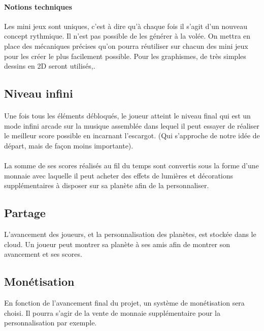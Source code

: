 \documentclass[a4paper,11pt]{article}
\begin{document}
\paragraph{Notions techniques}
Les mini jeux sont uniques, c’est à dire qu’à chaque fois il s’agit d’un nouveau concept rythmique. Il n’est pas possible de les générer à la volée. On mettra en place des mécaniques précises qu’on pourra réutiliser sur chacun des mini jeux pour les créer le plus facilement possible. Pour les graphismes, de très simples dessins en 2D seront utilisés,. 

\subsection{Niveau infini}
\paragraph{} Une fois tous les éléments débloqués, le joueur atteint le niveau final qui est un mode infini arcade sur la musique assemblée dans lequel il peut essayer de réaliser le meilleur score possible en incarnant l’escargot. (Qui s’approche de notre idée de départ, mais de façon moins importante).

\paragraph{} La somme de ses scores réalisés au fil du temps sont convertis sous la forme d’une monnaie avec laquelle il peut acheter des effets de lumières et décorations supplémentaires à disposer sur sa planète afin de la personnaliser.

\subsection{Partage}
L’avancement des joueurs, et la personnalisation des planètes, est stockée dans le cloud. Un joueur peut montrer sa planète à ses amis afin de montrer son avancement et ses scores.

\subsection{Monétisation}
En fonction de l’avancement final du projet, un système de monétisation sera choisi. Il pourra s’agir de la vente de monnaie supplémentaire pour la personnalisation par exemple.
\end{document}
